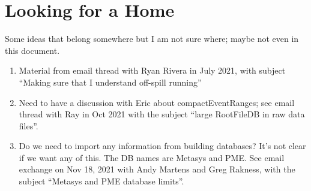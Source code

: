 \chapter{Looking for a Home}
\label{app:LookingForaHome}

Some ideas that belong somewhere but I am not sure where;
maybe not even in this document.

\begin{enumerate}
\item Material from email thread with Ryan Rivera in July 2021,
  with subject ``Making sure that I understand off-spill running''
\item Need to have a discussion with Eric about compactEventRanges;
  see email thread with Ray in Oct 2021 with the subject
  ``large RootFileDB in raw data files''.
\item Do we need to import any information from building databases?
  It's not clear if we want any of this.
  The DB names are Metasys and PME.
  See email exchange on Nov 18, 2021 with Andy Martens and Greg Rakness,
  with the subject ``Metasys and PME database limits''.
\end{enumerate}
